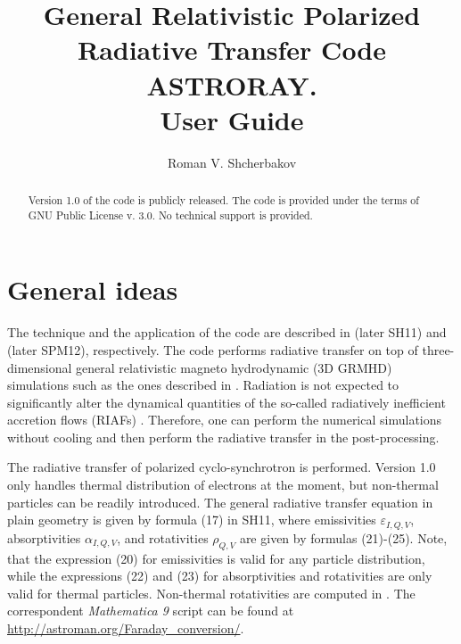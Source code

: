 \documentclass{emulateapj}
\newcommand{\mat}{\textit{Mathematica 9 }}
\begin{document}
\title{General Relativistic Polarized Radiative Transfer Code ASTRORAY. \\User Guide}

\author{Roman V. Shcherbakov}

\setcounter{page}{1}


\begin{abstract}
Version 1.0 of the code is publicly released.
The code is provided under the terms of GNU Public License v. 3.0.
No technical support is provided.
\end{abstract}


\section{General ideas}
The technique and the application of the code are described in \citet{Shcherbakov:2011inter} (later SH11) and \citet{Shcherbakov:2012appl} (later SPM12), respectively.
The code performs radiative transfer on top of three-dimensional general relativistic magneto hydrodynamic (3D GRMHD) simulations such as the ones described in
\citet{Penna:2010dj,Tchekhovskoy:2011qp,McKinney2012,Narayan:2012dw}. Radiation is not expected to significantly alter the dynamical quantities of the
so-called radiatively inefficient accretion flows (RIAFs) \citep{Narayan:1998re,Quataert:2001op}. Therefore, one can perform the numerical simulations
without cooling and then perform the radiative transfer in the post-processing.

The radiative transfer of polarized cyclo-synchrotron is performed. Version 1.0 only handles thermal distribution of electrons at the moment, 
but non-thermal particles can be readily introduced.
The general radiative transfer equation in plain geometry is given by formula (17) in SH11, where emissivities $\varepsilon_{I,Q,V}$, absorptivities $\alpha_{I,Q,V}$, and rotativities
$\rho_{Q,V}$ are given by formulas (21)-(25). Note, that the expression (20) for emissivities is valid for any particle distribution, while the expressions (22) and (23)
for absorptivities and rotativities are only valid for thermal particles. Non-thermal rotativities are computed in \citet{Huang:2011de}. The correspondent \mat script
can be found at \url{http://astroman.org/Faraday_conversion/}.
\end{document}
